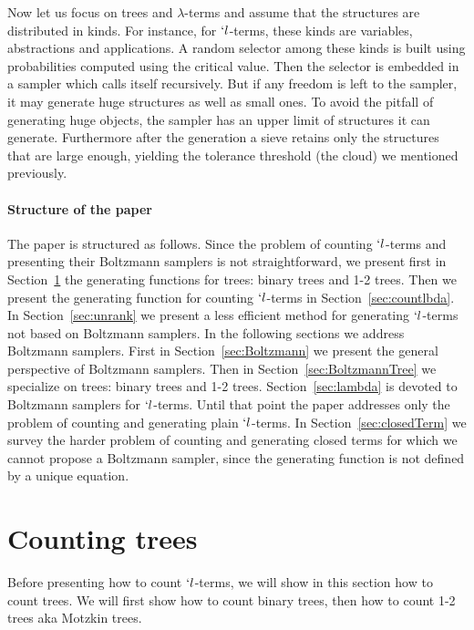 \documentclass{sig-alternate}
\begin{document}
Now let us focus on trees and $\lambda$-terms and assume that the structures are
distributed in kinds. For instance, for $`l$-terms, these kinds are variables,
abstractions and applications.  A random selector among these kinds is built using
probabilities computed using the critical value.  Then the selector is embedded in a
sampler which calls itself recursively.  But if any freedom is left to the sampler,
it may generate huge structures as well as small ones.  To avoid the pitfall of generating
huge objects, the sampler has an upper limit of structures it can
generate. Furthermore after the generation a sieve retains only the structures
that are large enough, yielding the tolerance threshold (the cloud) we mentioned
previously.

\paragraph{Structure of the paper}

The paper is structured as follows.  Since the problem of counting $`l$-terms and
presenting their Boltzmann samplers is not straightforward, we present first in
Section~\ref{sec:trees} the generating functions for trees: binary trees and 1-2
trees. Then we present the generating function for counting $`l$-terms in
Section~\ref{sec:countlbda}.  In Section~\ref{sec:unrank} we present a less efficient
method for generating $`l$-terms not based on Boltzmann samplers. In the following
sections we address Boltzmann samplers. First in Section~\ref{sec:Boltzmann} we
present the general perspective of Boltzmann samplers.  Then in
Section~\ref{sec:BoltzmannTree} we specialize on trees: binary trees and 1-2
trees. Section~\ref{sec:lambda} is devoted to Boltzmann samplers for $`l$-terms.
Until that point the paper addresses only the problem of counting and generating
plain $`l$-terms.  In Section~\ref{sec:closedTerm} we survey the harder problem of
counting and generating closed terms for which we cannot propose a Boltzmann sampler,
since the generating function is not defined by a unique equation.

\section{Counting trees}
\label{sec:trees}

Before presenting how to count $`l$-terms, we will show in this section how to count
trees. We will first show how to count binary trees, then how to count 1-2 trees aka
Motzkin trees.
\end{document}
